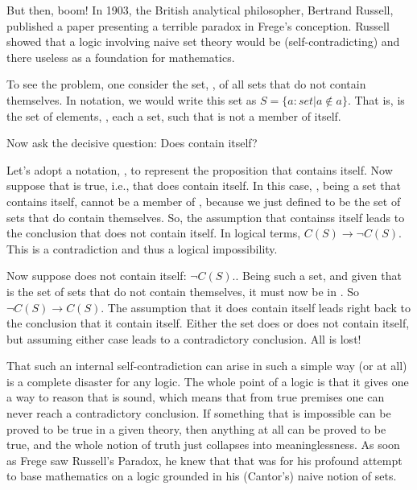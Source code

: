 \documentclass[letterpaper,10pt,english]{sphinxmanual}
\begin{document}
But then, boom! In 1903, the British analytical philosopher, Bertrand
Russell, published a paper presenting a terrible paradox in Frege’s
conception. Russell showed that a logic involving naive set theory
would be  (self-contradicting) and there useless as a
foundation for mathematics.

To see the problem, one consider the set, , of all sets that do not
contain themselves. In  notation, we would write
this set as \(S = \{ a: set | a \notin a \}.\) That is,  is the
set of elements, , each a set, such that  is not a member of
itself.

Now ask the decisive question: Does  contain itself?

Let’s adopt a notation, , to represent the proposition that 
contains itself. Now suppose that  is true, i.e., that  does
contain itself. In this case, , being a set that contains itself,
cannot be a member of , because we just defined  to be the set
of sets that do  contain themselves. So, the assumption that 
containss itself leads to the conclusion that  does not contain
itself. In logical terms, \(C(S) \rightarrow \neg C(S).\) This is
a contradiction and thus a logical impossibility.

Now suppose  does not contain itself: \(\neg C(S).\). Being
such a set, and given that  is the set of sets that do not contain
themselves, it must now be in . So \(\neg C(S) \rightarrow
C(S).\) The assumption that it does  contain itself leads right
back to the conclusion that it  contain itself. Either the set
does or does not contain itself, but assuming either case leads to a
contradictory conclusion. All is lost!

That such an internal self-contradiction can arise in such a simple
way (or at all) is a complete disaster for any logic. The whole point
of a logic is that it gives one a way to reason that is sound, which
means that from true premises one can never reach a contradictory
conclusion. If something that is impossible can be proved to be true
in a given theory, then anything at all can be proved to be true, and
the whole notion of truth just collapses into meaninglessness. As soon
as Frege saw Russell’s Paradox, he knew that that was  for
his profound attempt to base mathematics on a logic grounded in his
(Cantor’s) naive notion of sets.
\end{document}
